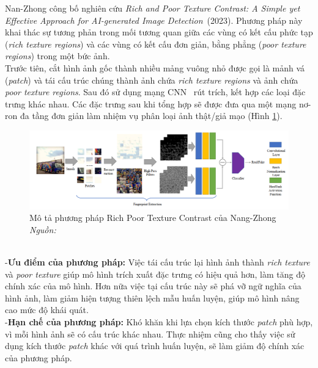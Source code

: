 Nan-Zhong công bố nghiên cứu \textit{Rich and Poor Texture Contrast: A Simple yet Effective Approach for AI-generated Image Detection}~\cite{zhong2023rich}(2023). Phương pháp này khai thác sự tương phản trong mối tương quan giữa các vùng có kết cấu phức tạp (\textit{rich texture regions}) và các vùng có kết cấu đơn giản, bằng phẳng (\textit{poor texture regions}) trong một bức ảnh. \\
%
Trước tiên, cắt hình ảnh gốc thành nhiều mảng vuông nhỏ được gọi là mảnh vá (\textit{patch}) và tái cấu trúc chúng thành ảnh chứa \textit{rich texture regions} và ảnh chứa \textit{poor texture regions}. Sau đó sử dụng mạng CNN~\cite{Krizhevsky2012ImageNetCW} rút trích, kết hợp các loại đặc trưng khác nhau. Các đặc trưng sau khi tổng hợp sẽ được đưa qua một mạng nơ-ron đa tầng đơn giản làm nhiệm vụ phân loại ảnh thật/giả mạo (Hình \ref{fig:model-rich-poor-textture-1}).
%
\begin{figure}[ht!]
	\centering
	\includegraphics[width=1.0\linewidth]{Images/model-rich-poor-textture-1.png}
	\begin{minipage}{0.9\linewidth}
		\caption{Mô tả phương pháp Rich Poor Texture Contrast của Nang-Zhong \textit{Nguồn: \cite{zhong2023rich}}}
		\label{fig:model-rich-poor-textture-1}
	\end{minipage}
\end{figure}\\
%
-\textbf{Ưu điểm của phương pháp:}
Việc tái cấu trúc lại hình ảnh thành \textit{rich texture} và \textit{poor texture} giúp mô hình trích xuất đặc trưng có hiệu quả hơn, làm tăng độ chính xác của mô hình. Hơn nữa việc tại cấu trúc này sẽ phá vỡ ngữ nghĩa của hình ảnh, làm giảm hiện tượng thiên lệch mẫu huấn luyện, giúp mô hình nâng cao mức độ khái quát.\\
-\textbf{Hạn chế của phương pháp:}
Khó khăn khi lựa chọn kích thước \textit{patch} phù hợp, vì mỗi hình ảnh sẽ có cấu trúc khác nhau. Thực nhiệm cũng cho thấy việc sử dụng kích thước \textit{patch} khác với quá trình huấn luyện, sẽ làm giảm độ chính xác của phương pháp.
%
